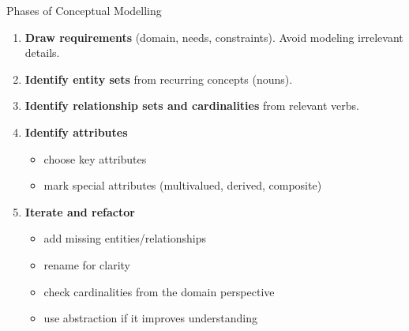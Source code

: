 \documentclass[10pt,aspectratio=169]{beamer}
\begin{document}
\begin{frame}{Phases of Conceptual Modelling}
\begin{enumerate}
  \item \textbf{Draw requirements} (domain, needs, constraints). Avoid modeling irrelevant details.
  \item \textbf{Identify entity sets} from recurring concepts (nouns).
  \item \textbf{Identify relationship sets and cardinalities} from relevant verbs.
  \item \textbf{Identify attributes}
  \begin{itemize}
    \item choose key attributes
    \item mark special attributes (multivalued, derived, composite)
  \end{itemize}
  \item \textbf{Iterate and refactor}
  \begin{itemize}
    \item add missing entities/relationships
    \item rename for clarity
    \item check cardinalities from the domain perspective
    \item use abstraction if it improves understanding
  \end{itemize}
\end{enumerate}
\end{frame}
\end{document}
